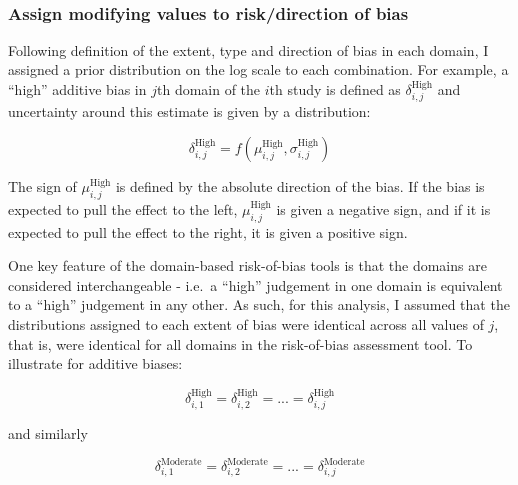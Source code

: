 \documentclass[a4paper, twoside]{templates/ociamthesis}
\begin{document}
~

\hypertarget{assign-modifying-values-to-riskdirection-of-bias}{%
\subsubsection{Assign modifying values to risk/direction of bias}\label{assign-modifying-values-to-riskdirection-of-bias}}

Following definition of the extent, type and direction of bias in each domain, I assigned a prior distribution on the log scale to each combination. For example, a ``high'' additive bias in \(j\)th domain of the \(i\)th study is defined as \(\delta_{i,j}^{\mathrm{High}}\) and uncertainty around this estimate is given by a distribution:

\begin{equation}
  \delta_{i,j}^{\mathrm{High}} = f(\mu_{i,j}^{\mathrm{High}}, \sigma_{i,j}^{\mathrm{High}})
  \label{eq:name}
\end{equation}

The sign of \(\mu_{i,j}^{\mathrm{High}}\) is defined by the absolute direction of the bias. If the bias is expected to pull the effect to the left, \(\mu_{i,j}^{\mathrm{High}}\) is given a negative sign, and if it is expected to pull the effect to the right, it is given a positive sign.

One key feature of the domain-based risk-of-bias tools is that the domains are considered interchangeable - i.e.~a ``high'' judgement in one domain is equivalent to a ``high'' judgement in any other. As such, for this analysis, I assumed that the distributions assigned to each extent of bias were identical across all values of \(j\), that is, were identical for all domains in the risk-of-bias assessment tool. To illustrate for additive biases:

\[
\delta_{i,1}^{\mathrm{High}} = \delta_{i,2}^{\mathrm{High}} = ... = \delta_{i,j}^{\mathrm{High}}
\]

and similarly

\[
\delta_{i,1}^{\mathrm{Moderate}} = \delta_{i,2}^{\mathrm{Moderate}} = ... = \delta_{i,j}^{\mathrm{Moderate}}
\]
\end{document}
